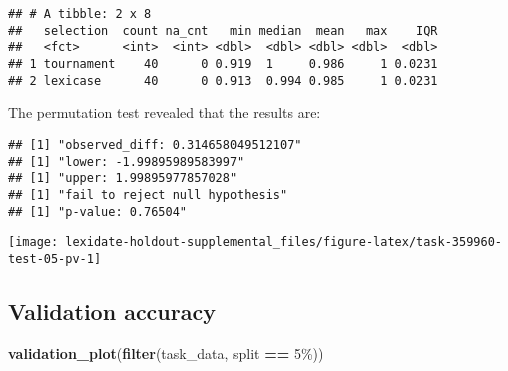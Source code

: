 \documentclass[
]{book}
\newenvironment{Shaded}{\begin{snugshade}}{\end{snugshade}}
\newcommand{\AttributeTok}[1]{\textcolor[rgb]{0.13,0.29,0.53}{#1}}
\newcommand{\DecValTok}[1]{\textcolor[rgb]{0.00,0.00,0.81}{#1}}
\newcommand{\FunctionTok}[1]{\textcolor[rgb]{0.13,0.29,0.53}{\textbf{#1}}}
\newcommand{\NormalTok}[1]{#1}
\newcommand{\OtherTok}[1]{\textcolor[rgb]{0.56,0.35,0.01}{#1}}
\newcommand{\SpecialCharTok}[1]{\textcolor[rgb]{0.81,0.36,0.00}{\textbf{#1}}}
\newcommand{\StringTok}[1]{\textcolor[rgb]{0.31,0.60,0.02}{#1}}
\begin{document}
\begin{verbatim}
## # A tibble: 2 x 8
##   selection  count na_cnt   min median  mean   max    IQR
##   <fct>      <int>  <int> <dbl>  <dbl> <dbl> <dbl>  <dbl>
## 1 tournament    40      0 0.919  1     0.986     1 0.0231
## 2 lexicase      40      0 0.913  0.994 0.985     1 0.0231
\end{verbatim}

The permutation test revealed that the results are:

\begin{Shaded}
\end{Shaded}

\begin{verbatim}
## [1] "observed_diff: 0.314658049512107"
## [1] "lower: -1.99895989583997"
## [1] "upper: 1.99895977857028"
## [1] "fail to reject null hypothesis"
## [1] "p-value: 0.76504"
\end{verbatim}

\texttt{[image: lexidate-holdout-supplemental\_files/figure-latex/task-359960-test-05-pv-1]}

\hypertarget{validation-accuracy-45}{%
\subsection{Validation accuracy}\label{validation-accuracy-45}}

\begin{Shaded}
\begin{Highlighting}[]
\FunctionTok{validation\_plot}\NormalTok{(}\FunctionTok{filter}\NormalTok{(task\_data, split }\SpecialCharTok{==} \StringTok{\textquotesingle{}5\%\textquotesingle{}}\NormalTok{))}
\end{Highlighting}
\end{Shaded}
\end{document}
